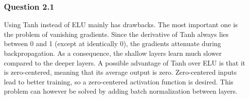 \documentclass{article}
\begin{document}
\subsubsection*{Question 2.1}
Using Tanh instead of ELU mainly has drawbacks. The most important one is the problem of vanishing gradients. Since the derivative of Tanh always lies between 0 and 1 (except at identically 0), the gradients attenuate during backpropagation. As a consequence, the shallow layers learn much slower compared to the deeper layers. A possible advantage of Tanh over ELU is that it is zero-centered, meaning that its average output is zero. Zero-centered inputs lead to better training, so a zero-centered activation function is desired. This problem can however be solved by adding batch normalization between layers.
\end{document}
